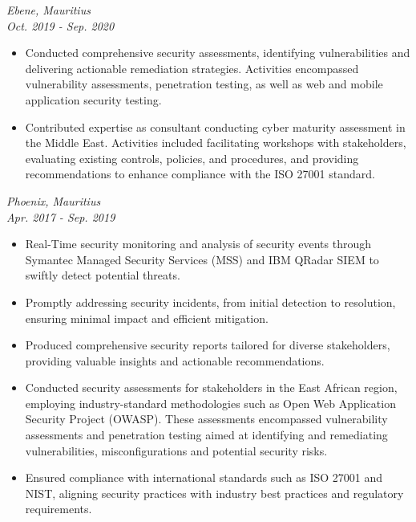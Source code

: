 \documentclass[a4paper, fleqn, oneside]{article}
\begin{document}
\vspace{2em}
{ \hfill \textit{Ebene, Mauritius}} \\
{ \hfill {\textit{Oct. 2019 - Sep. 2020}}}
\begin{itemize}
\item Conducted comprehensive security assessments, identifying vulnerabilities and delivering actionable remediation strategies. Activities encompassed vulnerability assessments, penetration testing, as well as web and mobile application security testing.
\item Contributed expertise as consultant conducting cyber maturity assessment in the Middle East. Activities included facilitating workshops with stakeholders, evaluating existing controls, policies, and procedures, and providing recommendations to enhance compliance with the ISO 27001 standard.
\end{itemize}

\vspace{2em}
{ \hfill \textit{Phoenix, Mauritius}} \\
{ \hfill {\textit{Apr. 2017 - Sep. 2019}}}
\begin{itemize}
\item Real-Time security monitoring and analysis of security events through Symantec Managed Security Services (MSS) and IBM QRadar SIEM to swiftly detect potential threats.
\item Promptly addressing security incidents, from initial detection to resolution, ensuring minimal impact and efficient mitigation.
\item Produced comprehensive security reports tailored for diverse stakeholders, providing valuable insights and actionable recommendations.
\item Conducted security assessments for stakeholders in the East African region, employing industry-standard methodologies such as Open Web Application Security Project (OWASP). These assessments encompassed vulnerability assessments and penetration testing aimed at identifying and remediating vulnerabilities, misconfigurations and potential security risks.
\item Ensured compliance with international standards such as ISO 27001 and NIST, aligning security practices with industry best practices and regulatory requirements.
\end{itemize}
\end{document}
